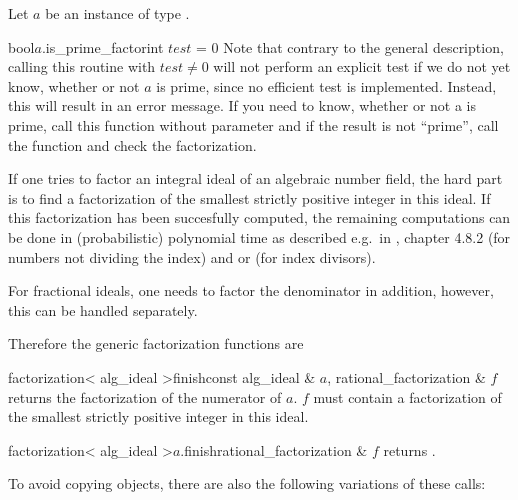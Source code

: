 
\HIGH

Let $a$ be an instance of type .


\begin{fcode}{bool}{$a$.is_prime_factor}{int $\mathit{test}$ = 0}
  Note that contrary to the general description, calling this routine with $\mathit{test} \neq
  0$ will not perform an explicit test if we do not yet know, whether or not $a$ is prime, since
  no efficient test is implemented.  Instead, this will result in an error message.  If you need
  to know, whether or not a  is prime, call this function
  without parameter and if the result is not ``prime'', call the function  and
  check the factorization.
\end{fcode}


If one tries to factor an integral ideal of an algebraic number field, the hard part is to find
a factorization of the smallest strictly positive integer in this ideal.  If this factorization
has been succesfully computed, the remaining computations can be done in (probabilistic)
polynomial time as described e.g.~in \cite{Cohen:1995}, chapter 4.8.2 (for numbers not dividing
the index) and \cite{Buchmann/LenstraHW} or \cite{Weber_Thesis:1993} (for index divisors).

For fractional ideals, one needs to factor the denominator in addition, however, this can be
handled separately.

Therefore the generic factorization functions are

\begin{fcode}{factorization< alg_ideal >}{finish}{const alg_ideal & $a$,
    rational_factorization & $f$}%
  returns the factorization of the numerator of $a$.  $f$ must contain a factorization of the
  smallest strictly positive integer in this ideal.
\end{fcode}

\begin{cfcode}{factorization< alg_ideal >}{$a$.finish}{rational_factorization & $f$}
  returns .
\end{cfcode}

To avoid copying objects, there are also the following variations of these calls:

